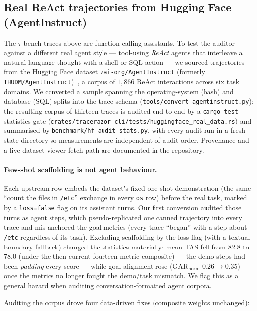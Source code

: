 \documentclass[11pt]{article}
\newcommand{\code}[1]{\texttt{#1}}
\begin{document}
\subsection{Real ReAct trajectories from Hugging Face (AgentInstruct)}
\label{sec:hf-agentinstruct}
The $\tau$-bench traces above are function-calling assistants. To test the
auditor against a different real agent style --- tool-using \emph{ReAct} agents
that interleave a natural-language thought with a shell or SQL action --- we
sourced trajectories from the Hugging Face dataset \code{zai-org/AgentInstruct}
(formerly \code{THUDM/AgentInstruct})~\cite{agentinstruct}, a corpus of
$1{,}866$ ReAct interactions across six task domains. We converted a sample
spanning the operating-system (bash) and database (SQL) splits into the trace
schema (\code{tools/convert\_agentinstruct.py}); the resulting corpus of
thirteen traces is audited end-to-end by a \code{cargo test} statistics gate
(\code{crates/tracerazor-cli/tests/huggingface\_real\_data.rs}) and summarised by
\code{benchmark/hf\_audit\_stats.py}, with every audit run in a fresh state
directory so measurements are independent of audit order. Provenance and a live
dataset-viewer fetch path are documented in the repository.

\paragraph{Few-shot scaffolding is not agent behaviour.} Each upstream row
embeds the dataset's fixed one-shot demonstration (the same ``count the files
in \code{/etc}'' exchange in every \code{os} row) before the real task, marked
by a \code{loss{=}false} flag on its assistant turns. Our first conversion
audited those turns as agent steps, which pseudo-replicated one canned
trajectory into every trace and mis-anchored the goal metrics (every trace
``began'' with a step about \code{/etc} regardless of its task). Excluding
scaffolding by the loss flag (with a textual-boundary fallback) changed the
statistics materially: mean TAS fell from $82.8$ to $78.0$ (under the
then-current fourteen-metric composite) --- the demo steps
had been \emph{padding} every score --- while goal alignment rose
($\mathrm{GAR_{norm}}$ $0.26\to0.35$) once the metrics no longer fought the
demo/task mismatch. We flag this as a general hazard when auditing
conversation-formatted agent corpora.

Auditing the corpus drove four data-driven fixes (composite weights unchanged):
\end{document}

